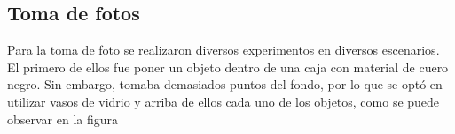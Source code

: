 \documentclass[conference]{IEEEtran}
\begin{document}
\subsection{Toma de fotos}
Para la toma de foto se realizaron diversos experimentos en diversos escenarios. El primero de ellos fue poner un objeto dentro de una caja con material de cuero negro. Sin embargo, tomaba demasiados puntos del fondo, por lo que se optó en utilizar vasos de vidrio y arriba de ellos cada uno de los objetos, como se puede observar en la figura 



\end{document}
